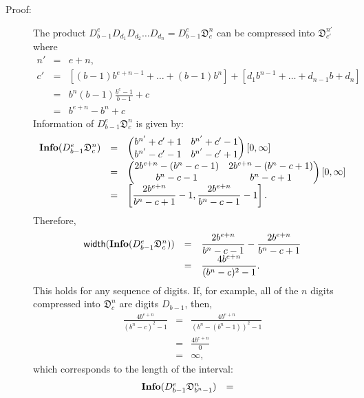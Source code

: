 \documentclass[11pt,a4paper]{article}
\newenvironment{proof}
	{ \begin{description} \item[Proof:] \footnotesize }
	{ \end{description} }
\begin{document}
	\begin{proof}
		The product $D_{b-1}^e D_{d_1} D_{d_2} \ldots D_{d_n} = D_{b-1}^e
		\mathfrak{D}_c^n$ can be compressed into $\mathfrak{D}_{c'}^{n'}$ where
		\[ \begin{array}{rcl}
			n' &=& e+n, \\
			c' &=& \left[ (b-1)b^{e+n-1} + \ldots + (b-1)b^n \right] + \left[
				d_1 b^{n-1} + \ldots + d_{n-1} b + d_n \right] \\
			&=& \displaystyle{ b^n (b-1) \frac{b^e-1}{b-1} + c } \\
			&=& b^{e+n} - b^n + c
		\end{array} \]
		Information of $D_{b-1}^e \mathfrak{D}_c^n$ is given by:
		\[ \begin{array}{rcl}
			{\bf Info} (D_{b-1}^e \mathfrak{D}_c^n) &=& \begin{pmatrix}
				b^{n'}+c'+1 & b^{n'}+c'-1 \\ b^{n'}-c'-1 & b^{n'}-c'+1
				\end{pmatrix} [0,\infty] \\
			&=& \begin{pmatrix} 2b^{e+n}-(b^n-c-1) & 2b^{e+n}-(b^n-c+1)
				\\ b^n-c-1 & b^n-c+1 \end{pmatrix} [0,\infty] \\
			&=& \left[ \displaystyle{ \frac{2b^{e+n}}{b^n-c+1} - 1,
				\frac{2b^{e+n}}{b^n-c-1} - 1 } \right].
		\end{array} \]
		Therefore,
		\[ \begin{array}{rcl}
			{\sf width} ( {\bf Info} ( D_{b-1}^e \mathfrak{D}_c^n ) ) &=&
				\displaystyle{ \frac{2b^{e+n}}{b^n-c-1} -
				\frac{2b^{e+n}}{b^n-c+1} } \\
			&=& \displaystyle{ \frac{4b^{e+n}}{(b^n-c)^2-1}. }
		\end{array} \]
		This holds for any sequence of digits. If, for example, all of the
		$n$ digits compressed into $\mathfrak{D}_c^n$ are digits $D_{b-1}$,
		then,
		\[ \begin{array}{rcl}
			\displaystyle{ \frac{4b^{e+n}}{(b^n-c)^2-1} } &=&
				\displaystyle{ \frac{4b^{e+n}}{(b^n-(b^n-1))^2-1} } \\
			&=& \displaystyle{ \frac{4b^{e+n}}{0} } \\
			&=& \infty,
		\end{array} \]
		which corresponds to the length of the interval:
		\[ \begin{array}{rcl}
			{\bf Info} ( D_{b-1}^e \mathfrak{D}_{b^n-1}^n ) &=&

\end{array}\]
\end{proof}
\end{document}
